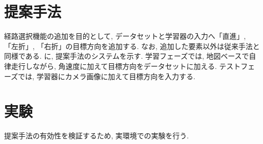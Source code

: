 \documentclass[10pt]{jarticle}
\begin{document}
    \section{提案手法}

    経路選択機能の追加を目的として, データセットと学習器の入力へ「直進」, 「左折」, 「右折」の目標方向を追加する. なお, 追加した要素以外は従来手法と同様である. に, 提案手法のシステムを示す. 
    学習フェーズでは, 地図ベースで自律走行しながら, 角速度に加えて目標方向をデータセットに加える. テストフェーズでは, 学習器にカメラ画像に加えて目標方向を入力する.


    \section{実験}
    提案手法の有効性を検証するため, 実環境での実験を行う. 
\end{document}
